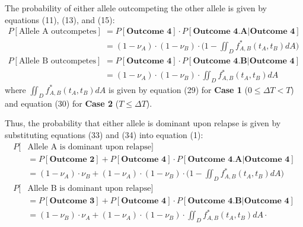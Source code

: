 \documentclass{article}
\begin{document}
The probability of either allele outcompeting the other allele is given by equations (11), (13), and (15):
\begin{equation}
\begin{split}
P[\text{Allele A outcompetes}] &= P[\textbf{Outcome 4}] \cdot P[\textbf{Outcome 4.A}|\textbf{Outcome 4}] \\
&= (1-\nu_A)\cdot(1-\nu_B)\cdot \Big(1- \iint_D f^*_{A,B}(t_{A},t_{B}) dA\Big) \\
P[\text{Allele B outcompetes}] &= P[\textbf{Outcome 4}] 
\cdot P[\textbf{Outcome 4.B}|\textbf{Outcome 4}]  \\
&= (1-\nu_A)\cdot(1-\nu_B)\cdot \iint_D f^*_{A,B}(t_{A},t_{B}) dA
\end{split}
\end{equation}
where $\iint_D f^*_{A,B} (t_{A},t_{B}) dA$ is given by equation (29) for \textbf{Case 1} ($0 \leq \Delta T < T$) and equation (30) for \textbf{Case 2} ($T \leq \Delta T$).

Thus, the probability that either allele is dominant upon relapse is given by substituting equations (33) and (34) into equation (1):
\begin{equation}
\begin{split}
P[&\text{Allele A is dominant upon relapse}] \\ & = P[\textbf{Outcome 2}] + P[\textbf{Outcome 4}] \cdot P[\textbf{Outcome 4.A}|\textbf{Outcome 4}] \\
& = (1-\nu_A) \cdot \nu_B + (1-\nu_A)\cdot(1-\nu_B)\cdot \Big(1- \iint_D f^*_{A,B}(t_{A},t_{B}) dA\Big) \\
P[&\text{Allele B is dominant upon relapse}] \\ & = P[\textbf{Outcome 3}] + P[\textbf{Outcome 4}] \cdot P[\textbf{Outcome 4.B}|\textbf{Outcome 4}]  \\
& = (1-\nu_B) \cdot \nu_A + (1-\nu_A)\cdot(1-\nu_B)\cdot  \iint_D f^*_{A,B}(t_{A},t_{B}) dA \cdot
\end{split}
\end{equation}
\end{document}
